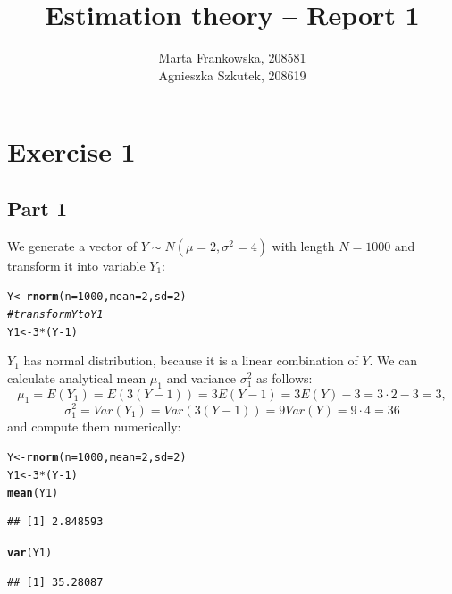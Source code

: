 \documentclass[12pt, a4paper]{article}\usepackage[]{graphicx}\usepackage[]{color}
\makeatletter
\newcommand{\hlnum}[1]{\textcolor[rgb]{0.686,0.059,0.569}{#1}}%
\newcommand{\hlcom}[1]{\textcolor[rgb]{0.678,0.584,0.686}{\textit{#1}}}%
\newcommand{\hlopt}[1]{\textcolor[rgb]{0,0,0}{#1}}%
\newcommand{\hlstd}[1]{\textcolor[rgb]{0.345,0.345,0.345}{#1}}%
\newcommand{\hlkwb}[1]{\textcolor[rgb]{0.69,0.353,0.396}{#1}}%
\newcommand{\hlkwc}[1]{\textcolor[rgb]{0.333,0.667,0.333}{#1}}%
\newcommand{\hlkwd}[1]{\textcolor[rgb]{0.737,0.353,0.396}{\textbf{#1}}}%
\newenvironment{kframe}{%
 \def\at@end@of@kframe{}%
 \ifinner\ifhmode%
  \def\at@end@of@kframe{\end{minipage}}%
  \begin{minipage}{\columnwidth}%
 \fi\fi%
 \def\FrameCommand##1{\hskip\@totalleftmargin \hskip-\fboxsep
 \colorbox{shadecolor}{##1}\hskip-\fboxsep
     \hskip-\linewidth \hskip-\@totalleftmargin \hskip\columnwidth}%
 \MakeFramed {\advance\hsize-\width
   \@totalleftmargin\z@ \linewidth\hsize
   \@setminipage}}%
 {\par\unskip\endMakeFramed%
 \at@end@of@kframe}
\newenvironment{knitrout}{}{} %
\makeatother
\begin{document}
\title{Estimation theory -- Report 1}
\author{Marta Frankowska, 208581 \\ Agnieszka Szkutek, 208619}
\maketitle
\tableofcontents 


\section{Exercise 1}

\subsection{Part 1}
We generate a vector of $Y\sim N(\mu=2, \sigma^2=4)$ with length $N = 1000$ and transform it into variable $Y_1$:
\begin{knitrout}
\color{fgcolor}\begin{kframe}
\begin{alltt}
\hlstd{Y} \hlkwb{<-} \hlkwd{rnorm}\hlstd{(}\hlkwc{n} \hlstd{=} \hlnum{1000}\hlstd{,} \hlkwc{mean} \hlstd{=} \hlnum{2}\hlstd{,} \hlkwc{sd} \hlstd{=} \hlnum{2}\hlstd{)}
\hlcom{# transform Y to Y1}
\hlstd{Y1} \hlkwb{<-} \hlnum{3} \hlopt{*} \hlstd{(Y} \hlopt{-} \hlnum{1}\hlstd{)}
\end{alltt}
\end{kframe}
\end{knitrout}
$Y_1$ has normal distribution, because it is a linear combination of $Y$. We can calculate analytical mean $\mu_1$ and variance $\sigma^2_1$ as follows:
\[ \mu_1 = E(Y_1) = E(3 (Y-1)) = 3 E(Y - 1) = 3 E(Y) - 3 = 3 \cdot 2 - 3 = 3,\]
\[ \sigma^2_1 = Var(Y_1) = Var(3 (Y-1)) = 9 Var(Y) = 9 \cdot 4 = 36 \]
and compute them numerically:
\begin{knitrout}
\color{fgcolor}\begin{kframe}
\begin{alltt}
\hlstd{Y} \hlkwb{<-} \hlkwd{rnorm}\hlstd{(}\hlkwc{n} \hlstd{=} \hlnum{1000}\hlstd{,} \hlkwc{mean} \hlstd{=} \hlnum{2}\hlstd{,} \hlkwc{sd} \hlstd{=} \hlnum{2}\hlstd{)}
\hlstd{Y1} \hlkwb{<-} \hlnum{3} \hlopt{*} \hlstd{(Y} \hlopt{-} \hlnum{1}\hlstd{)}
\hlkwd{mean}\hlstd{(Y1)}
\end{alltt}
\begin{verbatim}
## [1] 2.848593
\end{verbatim}
\begin{alltt}
\hlkwd{var}\hlstd{(Y1)}
\end{alltt}
\begin{verbatim}
## [1] 35.28087
\end{verbatim}
\end{kframe}
\end{knitrout}
\end{document}
